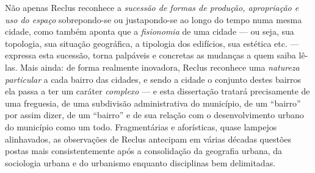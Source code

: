 Não apenas Reclus reconhece a \textit{sucessão de formas de produção, apropriação e uso do espaço} sobrepondo-se ou justapondo-se ao longo do tempo numa mesma cidade, como também aponta que a \textit{fisionomia} de uma cidade --- ou seja, sua topologia, sua situação geográfica, a tipologia dos edifícios, sua estética etc. --- expressa esta sucessão, torna palpáveis e concretas as mudanças a quem saiba lê-las. Mais ainda: de forma realmente inovadora, Reclus reconhece uma \textit{natureza particular} a cada bairro das cidades, e sendo a cidade o conjunto destes bairros ela passa a ter um caráter \textit{complexo} --- e esta dissertação tratará precisamente de uma freguesia, de uma subdivisão administrativa do município, de um ``bairro'' por assim dizer, de um ``bairro'' e de sua relação com o desenvolvimento urbano do município como um todo. Fragmentárias e aforísticas, quase lampejos alinhavados, as observações de Reclus antecipam em várias décadas questões postas mais consistentemente após a consolidação da geografia urbana, da sociologia urbana e do urbanismo enquanto disciplinas bem delimitadas.




